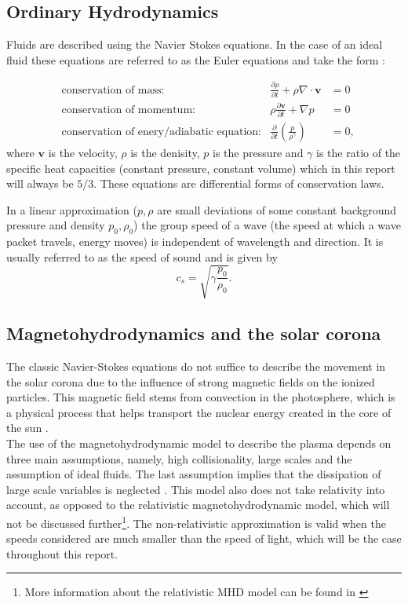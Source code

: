 \documentclass[a4paper]{article}
\begin{document}
\subsection{Ordinary Hydrodynamics} \label{sec:ordinary_hydrodynamics}

Fluids are described using the Navier Stokes equations. In the case of an ideal fluid these equations are referred to as the Euler equations and take the form \cite[section 1.3]{acheson1990}:

\begin{align*}
	&\text{conservation of mass:} &\frac{\partial \rho}{\partial t} + \rho \nabla \cdot \mathbf v &=  0 \\
				    &\text{conservation of momentum:} &\rho \frac{\partial \mathbf v}{\partial t} + \nabla p &= 0\\
				    &\text{conservation of enery/adiabatic equation:} &\frac{\partial }{\partial t} \left( \frac{p}{\rho^{\gamma}} \right)  &= 0
,\end{align*}
where $\mathbf v$ is the velocity,  $\rho$ is the denisity, $p$ is the pressure and $\gamma$ is the ratio of the specific heat capacities (constant pressure, constant volume) which in this report will always be $5 / 3$. 
These equations are differential forms of conservation laws. 

In a linear approximation ($p, \rho$ are small deviations of some constant background pressure and density $p_0, \rho_0$) the group speed of a wave (the speed at which a wave packet travels, energy moves) is independent of wavelength and direction. It is usually referred to as the speed of sound and is given by\cite[section 3.6]{acheson1990} \[
c_s = \sqrt{\gamma \frac{p_0}{\rho_0}} 
.\] 

\subsection{Magnetohydrodynamics and the solar corona} \label{sec:magnetohydrodynamics_and_the_solar_corona}
The classic Navier-Stokes equations do not suffice to describe the movement in the solar corona due to the influence of strong magnetic fields on the ionized particles. This magnetic field stems from convection in the photosphere, which is a physical process that helps transport the nuclear energy created in the core of the sun \cite{brun2017magnetism}.\\

The use of the magnetohydrodynamic model to describe the plasma depends on three main assumptions, namely, high collisionality, large scales and the assumption of ideal fluids. The last assumption implies that the dissipation of large scale variables is neglected \cite{goedbloed2004principles}. This model also does not take relativity into account, as opposed to the relativistic magnetohydrodynamic model, which will not be discussed further\footnote{More information about the relativistic MHD model can be found in \cite{karas2005introduction}}. The non-relativistic approximation is valid when the speeds considered are much smaller than the speed of light, which will be the case throughout this report.
\end{document}
